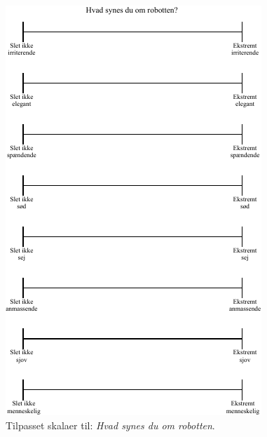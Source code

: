 \begin{figure}[H]
\centering
\includegraphics[width =\textwidth]{Figure/TilpasningAfSkalaer/HvadSynesDuOmR} 
\caption{Tilpasset skalaer til: \textit{Hvad synes du om robotten}.}
\label{fig:TilpasningHvadSynesDuOmR}
\end{figure}
\noindent
%
 
